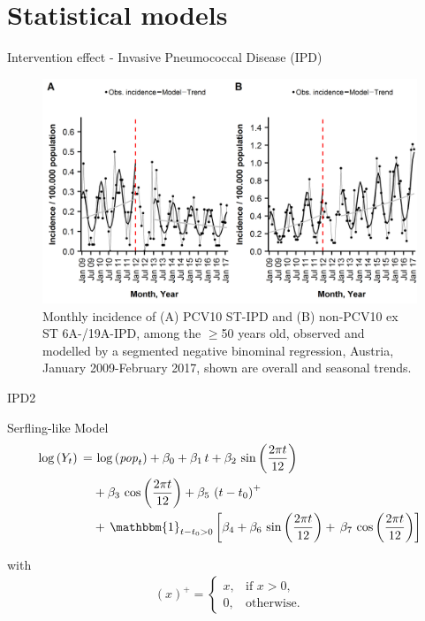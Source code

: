 \documentclass[table]{beamer}\usepackage[]{graphicx}\usepackage[]{color}
\newcommand{\Sin}[1]{\sin\left(#1\right)}%
\newcommand{\Cos}[1]{\cos\left(#1\right)}%
\newcommand{\Log}[1]{\log\left(#1\right)}%
\newcommand{\mli}[1]{\mathit{#1}}%
\begin{document}
\section{Statistical models}
\begin{frame}[fragile]{Intervention effect - Invasive Pneumococcal Disease (IPD)}
\begin{center}
\begin{figure}
  \centering
  \caption{Monthly incidence of (A) PCV10 ST-IPD and (B) non-PCV10 ex ST 6A-/19A-IPD, among the $\ge$50 years old, observed and modelled by a segmented negative binominal regression, Austria, January 2009-February 2017, shown are overall and seasonal trends.}
  \includegraphics[width=\textwidth,height=0.5\textheight,keepaspectratio]{richter2019_Fig3.png}
\end{figure}
\end{center}

\vfill
{\scriptsize \cite{richter2019}}
\end{frame}

\begin{frame}[fragile]{IPD2}

\begin{block}{Serfling-like Model}
\begin{align*}
\begin{split}
\Log{Y_t}\, =
  &\, \Log{\mli{pop}_t} + \beta_0+\beta_1\,t + \beta_2\,\Sin{\frac{2 \pi t}{12}} \\
  &+ \beta_3\,\Cos{\frac{2 \pi t}{12}} + \beta_5\,\left(t-t_0\right)^+ \\
  &+\, \mathbbm{1}_{t-t_0>0} \left[\beta_4 + \beta_6\,\sin\left(\frac{2 \pi t}{12}\right) + \,\beta_7\,\cos\left(\frac{2 \pi t}{12}\right)\right]
\end{split}
\end{align*}

with
\begin{align*} 
(x)^+ = 
\begin{cases}
x, &\text{if $x > 0$,}\\
0, &\text{otherwise.}
\end{cases}
\end{align*}
\end{block}

\end{frame}
\end{document}
